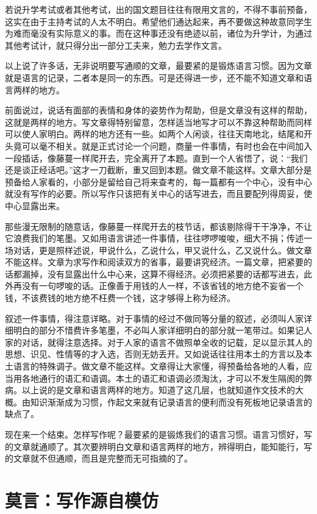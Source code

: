 \documentclass[fontset=fandol,12pt,a5paper]{ctexbook}
\begin{document}
若说升学考试或者其他考试，出的国文题目往往有限用文言的，不得不事前预备，这实在由于主持考试的人太不明白。希望他们通达起来，再不要做这种故意同学生为难而毫没有实际意义的事。而在这种事还没有绝迹以前，诸位为升学计，为通过其他考试计，就只得分出一部分工夫来，勉力去学作文言。

以上说了许多话，无非说明要写通顺的文章，最要紧的是锻炼语言习惯。因为文章就是语言的记录，二者本是同一的东西。可是还得进一步，还不能不知道文章和语言两样的地方。

前面说过，说话有面部的表情和身体的姿势作为帮助，但是文章没有这样的帮助，这就是两样的地方。写文章得特别留意，怎样适当地写才可以不靠这种帮助而同样可以使人家明白。两样的地方还有一些。如两个人闲谈，往往天南地北，结尾和开头竟可以毫不相关。就是正式讨论一个问题，商量一件事情，有时也会在中间加入一段插话，像藤蔓一样爬开去，完全离开了本题。直到一个人省悟了，说：“我们还是谈正经话吧。”这才一刀截断，重又回到本题。做文章不能这样。文章大部分是预备给人家看的，小部分是留给自己将来查考的，每一篇都有一个中心，没有中心就没有写作的必要。所以写作只该把有关中心的话写进去，而且要配列得周妥，使中心显露出来。

那些漫无限制的随意话，像藤蔓一样爬开去的枝节话，都该剔除得干干净净，不让它浪费我们的笔墨。又如用语言讲述一件事情，往往啰啰唆唆，细大不捐；传述一场对话，更是照样述说，甲说什么，乙说什么，甲又说什么，乙又说什么。做文章不能这样。文章为求写作和阅读双方的省事，最要讲究经济。一篇文章，把紧要的话都漏掉，没有显露出什么中心来，这算不得经济。必须把紧要的话都写进去，此外再没有一句啰唆的话。正像善于用钱的人一样，不该省钱的地方绝不妄省一个钱，不该费钱的地方绝不枉费一个钱，这才够得上称为经济。

叙述一件事情，得注意详略。对于事情的经过不做同等分量的叙述，必须叫人家详细明白的部分不惜费许多笔墨，不必叫人家详细明白的部分就一笔带过。如果记人家的对话，就得注意选择。对于人家的语言不做照单全收的记载，足以显示其人的思想、识见、性情等的才入选，否则无妨丢开。又如说话往往用本土的方言以及本土语言的特殊调子。做文章不能这样。文章得让大家懂，得预备给各地的人看，应当用各地通行的语汇和语调。本土的语汇和语调必须淘汰，才可以不发生隔阂的弊病。以上说的是文章和语言两样的地方。知道了这几层，也就知道作文技术的大概。由知识渐渐成为习惯，作起文来就有记录语言的便利而没有死板地记录语言的缺点了。

现在来一个结束。怎样写作呢？最要紧的是锻炼我们的语言习惯。语言习惯好，写的文章就通顺了。其次要辨明白文章和语言两样的地方，辨得明白，能知能行，写的文章就不但通顺，而且是完整而无可指摘的了。

\newpage

\section{莫言：写作源自模仿}
\end{document}
